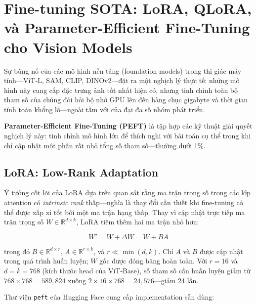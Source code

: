 \section{Fine-tuning SOTA: LoRA, QLoRA, và Parameter-Efficient Fine-Tuning cho Vision Models}
\label{sec:peft}

Sự bùng nổ của các mô hình nền tảng (foundation models) trong thị giác máy tính---ViT-L, SAM, CLIP, DINOv2---đặt ra một nghịch lý thực tế: những mô hình này cung cấp đặc trưng ảnh tốt nhất hiện có, nhưng tinh chỉnh toàn bộ tham số của chúng đòi hỏi bộ nhớ GPU lên đến hàng chục gigabyte và thời gian tính toán khổng lồ---ngoài tầm với của đại đa số nhóm phát triển.

\textbf{Parameter-Efficient Fine-Tuning (PEFT)} là tập hợp các kỹ thuật giải quyết nghịch lý này: tinh chỉnh mô hình lớn để thích nghi với bài toán cụ thể trong khi chỉ cập nhật một phần rất nhỏ tổng số tham số---thường dưới 1\%.

\subsection*{LoRA: Low-Rank Adaptation}

Ý tưởng cốt lõi của LoRA dựa trên quan sát rằng ma trận trọng số trong các lớp attention có \textit{intrinsic rank} thấp---nghĩa là thay đổi cần thiết khi fine-tuning có thể được xấp xỉ tốt bởi một ma trận hạng thấp. Thay vì cập nhật trực tiếp ma trận trọng số $W \in \mathbb{R}^{d \times k}$, LoRA tiêm thêm hai ma trận nhỏ hơn:

$$W' = W + \Delta W = W + BA$$

trong đó $B \in \mathbb{R}^{d \times r}$, $A \in \mathbb{R}^{r \times k}$, và $r \ll \min(d, k)$. Chỉ $A$ và $B$ được cập nhật trong quá trình huấn luyện; $W$ gốc được đóng băng hoàn toàn. Với $r = 16$ và $d = k = 768$ (kích thước head của ViT-Base), số tham số cần huấn luyện giảm từ $768 \times 768 = 589{,}824$ xuống $2 \times 16 \times 768 = 24{,}576$---giảm 24 lần.

Thư viện \texttt{peft} của Hugging Face cung cấp implementation sẵn dùng:

